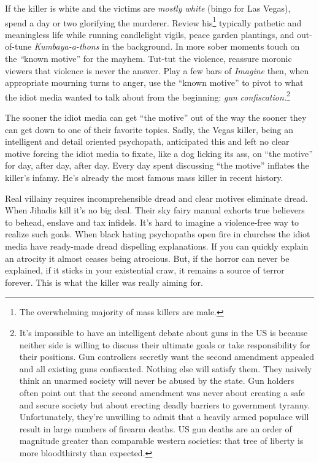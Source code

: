 If the killer is white and the victims are \emph{mostly white} (bingo
for Las Vegas), spend a day or two glorifying the murderer. Review
his\footnote{The overwhelming majority of mass killers are male.} typically pathetic and
meaningless life while running candlelight vigils, peace garden
plantings, and out-of-tune \emph{Kumbaya-a-thons} in the background. In
more sober moments touch on the \emph{``}known motive'' for the mayhem.
Tut-tut the violence, reassure moronic viewers that violence is never
the answer. Play a few bars of \emph{Imagine} then, when appropriate
mourning turns to anger, use the ``known motive'' to pivot to what the
idiot media wanted to talk about from the beginning: \emph{gun}
\emph{confiscation.}\footnote{It's impossible to have an intelligent debate about guns in the US is
  because neither side is willing to discuss their ultimate goals or
  take responsibility for their positions. Gun controllers secretly want
  the second amendment appealed and all existing guns confiscated.
  Nothing else will satisfy them. They naively think an unarmed society
  will never be abused by the state. Gun holders often point out that
  the second amendment was never about creating a safe and secure
  society but about erecting deadly barriers to government tyranny.
  Unfortunately, they're unwilling to admit that a heavily armed
  populace will result in large numbers of firearm deaths. US gun deaths
  are an order of magnitude greater than comparable western societies:
  that tree of liberty is more bloodthirsty than
  expected.
}

The sooner the idiot media can get ``the motive'' out of the way the
sooner they can get down to one of their favorite topics. Sadly, the
Vegas killer, being an intelligent and detail oriented psychopath,
anticipated this and left no clear motive forcing the idiot media to
fixate, like a dog licking its ass, on ``the motive'' for day, after
day, after day. Every day spent discussing ``the motive'' inflates the
killer's infamy. He's already the most famous mass killer in recent
history.

Real villainy requires incomprehensible dread and clear motives
eliminate dread. When Jihadis kill it's no big deal. Their sky fairy
manual exhorts true believers to behead, enslave and tax infidels. It's
hard to imagine a violence-free way to realize such goals. When black
hating psychopaths open fire in churches the idiot media have ready-made
dread dispelling explanations. If you can quickly explain an atrocity it
almost ceases being atrocious. But, if the horror can never be
explained, if it sticks in your existential craw, it remains a source of
terror forever. This is what the killer was really aiming for.

